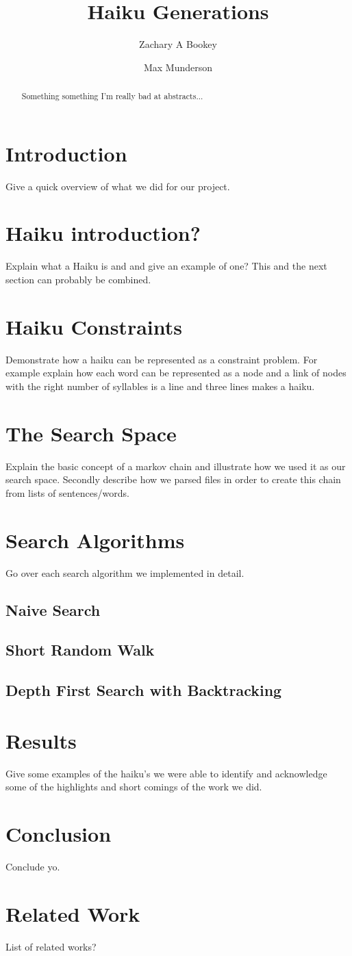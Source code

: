 \documentclass[]{article}
\title{Haiku Generations}
\author{Zachary A Bookey \and Max Munderson}
\begin{document}
\maketitle

\begin{abstract}
Something something I'm really bad at abstracts...
\end{abstract}

\section{Introduction}
Give a quick overview of what we did for our project.

\section{Haiku introduction?}
Explain what a Haiku is and and give an example of one? This and the next section can probably be combined.

\section{Haiku Constraints}
Demonstrate how a haiku can be represented as a constraint problem. For example explain how each word can be represented as a node and a link of nodes with the right number of syllables is a line and three lines makes a haiku.

\section{The Search Space}
Explain the basic concept of a markov chain and illustrate how we used it as our search space. Secondly describe how we parsed files in order to create this chain from lists of sentences/words.

\section{Search Algorithms}
Go over each search algorithm we implemented in detail.
\subsection{Naive Search}

\subsection{Short Random Walk}

\subsection{Depth First Search with Backtracking}

\section{Results}
Give some examples of the haiku's we were able to identify and acknowledge some of the highlights and short comings of the work we did.

\section{Conclusion}
Conclude yo.

\section{Related Work}
List of related works?
\end{document}
